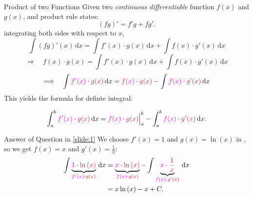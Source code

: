 \documentclass[10pt, aspectratio=1610]{beamer}
\begin{document}
\begin{frame}{Product of two Functions}\vspace{10pt}\label{slide:5}
  Given two \textit{continuous differentiable} function $f(x)$ and $g(x)$, and product rule states:
  \[(fg)'=f'g+fg'.\]
  integrating both sides with respect to $x$,
  \[\int (fg)'(x)\,\mathrm{d}x = \int f'(x)\cdot g(x)\,\mathrm{d}x + \int f(x)\cdot g'(x)\,\mathrm{d}x\]
  \[\Longrightarrow \quad f(x)\cdot g(x)= \int f'(x)\cdot g(x)\,\mathrm{d}x + \int f(x)\cdot g'(x)\,\mathrm{d}x\]
  \[\Longrightarrow \quad \int \textcolor[rgb]{1,0,1}{f'(x)}\cdot \textcolor[rgb]{0.77,0.12,0.23}{g(x)}\,\mathrm{d}x = \textcolor[rgb]{1,0,1}{f(x)}\cdot \textcolor[rgb]{0.77,0.12,0.23}{g(x)} - \int \textcolor[rgb]{1,0,1}{f(x)}\cdot \textcolor[rgb]{0.77,0.12,0.23}{g'(x)}\,\mathrm{d}x\]
  This yields the formula for definte integral:\vspace{-2mm}
  \begin{tcolorbox}[enhanced,colframe=red!75!black,interior style={left color=red!20!white,right color=yellow!50!white},rounded corners]
    \begin{equation}\label{partielle integration}
      \int_a^b \textcolor[rgb]{1,0,1}{f'(x)} \cdot \textcolor[rgb]{0.77,0.12,0.23}{g(x)}\,\mathrm{d}x = \Bigl. \textcolor[rgb]{1,0,1}{f(x)} \cdot \textcolor[rgb]{0.77,0.12,0.23}{g(x)}\Bigr|_a^{b} - \int_a^b \textcolor[rgb]{1,0,1}{f(x)} \cdot \textcolor[rgb]{0.77,0.12,0.23}{g'(x)}\,\mathrm{d}x.
    \end{equation}
  \end{tcolorbox}
\end{frame}
\begin{frame}{Answer of Question in \vref{slide:1}}\vspace{10pt}\label{frame:4}
  We choose $f'(x)=1$ and $g(x)=\ln{(x)}$ in , so we get $f(x)=x$ and $g'(x)=\frac{1}{x}$:
  \begin{align*}
    \int \underbrace{\textcolor[rgb]{1,0,1}{1} \cdot \textcolor[rgb]{0.77,0.12,0.23}{\ln{(x)}}}_{\textcolor[rgb]{1,0,1}{f'(x)} \cdot \textcolor[rgb]{0.77,0.12,0.23}{g(x)}}\,\mathrm{d}x 
    &=\underbrace{\textcolor[rgb]{1,0,1}{x}\cdot \textcolor[rgb]{0.77,0.12,0.23}{\ln{(x)}}}_{\textcolor[rgb]{1,0,1}{f(x)}\cdot \textcolor[rgb]{0.77,0.12,0.23}{g(x)}} - \int \underbrace{\textcolor[rgb]{1,0,1}{x}\cdot \textcolor[rgb]{0.77,0.12,0.23}{\frac{1}{x}}}_{\textcolor[rgb]{1,0,1}{f(x)}\cdot \textcolor[rgb]{0.77,0.12,0.23}{g'(x)}}\,\mathrm{d}x\\
    &=x\ln{(x)} - x + C.
  \end{align*}
\end{frame}
\end{document}
